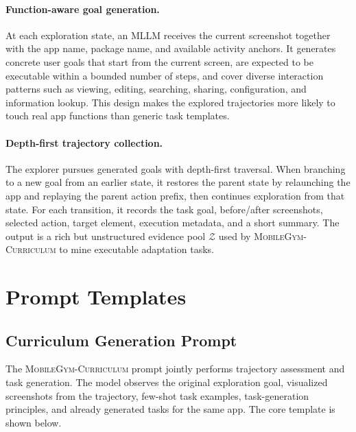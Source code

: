 \documentclass{llmxive}
\providecommand{\curriculum}{\textsc{MobileGym-Curriculum}\xspace}
\begin{document}
\paragraph{Function-aware goal generation.}
At each exploration state, an MLLM receives the current screenshot together with the app name, package name, and available activity anchors. It generates concrete user goals that start from the current screen, are expected to be executable within a bounded number of steps, and cover diverse interaction patterns such as viewing, editing, searching, sharing, configuration, and information lookup. This design makes the explored trajectories more likely to touch real app functions than generic task templates.

\paragraph{Depth-first trajectory collection.}
The explorer pursues generated goals with depth-first traversal. When branching to a new goal from an earlier state, it restores the parent state by relaunching the app and replaying the parent action prefix, then continues exploration from that state. For each transition, it records the task goal, before/after screenshots, selected action, target element, execution metadata, and a short summary. The output is a rich but unstructured evidence pool $\mathcal{Z}$ used by \curriculum to mine executable adaptation tasks.

\section{Prompt Templates}
\label{sec:appendix_prompts}

\subsection{Curriculum Generation Prompt}
\label{sec:curriculum_prompt}

The \curriculum prompt jointly performs trajectory assessment and task generation. The model observes the original exploration goal, visualized screenshots from the trajectory, few-shot task examples, task-generation principles, and already generated tasks for the same app. The core template is shown below.
\end{document}
